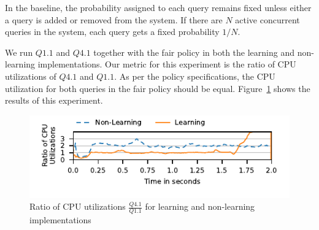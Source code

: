 In the baseline, the probability assigned to each query remains fixed unless either a query is added or removed from the system.
If there are $N$ active concurrent queries in the system, each query gets a fixed probability $1/N$.

We run $Q1.1$ and $Q4.1$ together with the fair policy in both the learning and 
non-learning implementations.
Our metric for this experiment is the ratio of CPU utilizations of $Q4.1$ and $Q1.1$.
As per the policy specifications, the CPU utilization for both queries in the fair policy 
should be equal. %
Figure~\ref{fig:non-learning-comparison} shows the results of this experiment.

\begin{figure}[]
	\centering
	\includegraphics[width=\columnwidth]{figures/q1-q11-ratio-cpu-util.pdf}
	\vspace{-2.5em}
	\caption{Ratio of CPU utilizations  $\frac{Q4.1}{Q1.1}$ for learning and non-learning 
		implementations}
	\label{fig:non-learning-comparison}
	\vspace{-0.8em}
\end{figure}

